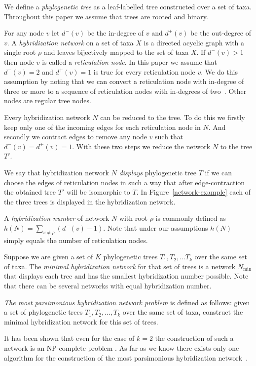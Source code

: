 \documentclass[runningheads, envcountsame, a4paper]{llncs}
\begin{document}
We define a \emph{phylogenetic tree} as a leaf-labelled tree constructed over a set of taxa. 
Throughout this paper we assume that trees are rooted and binary.

For any node $v$ let $d^-(v)$ be the in-degree of $v$ and $d^+(v)$ be the out-degree of $v$.
A \emph{hybridization network} on a set of taxa $X$ is a directed acyclic graph 
with a single root $\rho$ and leaves bijectively mapped to the set of taxa $X$. If $d^-(v) > 1$ then 
node $v$ is called a \emph{reticulation node}. In this paper we assume that $d^-(v) = 2$ and $d^+(v) = 1$ is true for every reticulation node $v$.
We do this assumption by noting that we can convert a reticulation node with in-degree 
of three or more to a sequence of reticulation nodes with in-degrees of two~\cite{wu2010close}. Other nodes are regular 
tree nodes.

Every hybridization network $N$ can be reduced to the tree. To do this we firstly keep only one of the incoming edges for each reticulation node in $N$. 
And secondly we contract edges to remove any node $v$ such that $d^-(v) = d^+(v) = 1$. With these two steps we reduce the network $N$ 
to the tree $T'$.

We say that hybridization network $N$ \emph{displays} phylogenetic tree $T$ 
if we can choose the edges of reticulation nodes in such a way that after edge-contraction the obtained tree $T'$ will be 
isomorphic to $T$. In Figure~\ref{network-example} each of the three trees is displayed in the hybridization network.

A \emph{hybridization number} of network $N$ with root $\rho$ is commonly defined as $h(N) = \sum\limits_{v \ne \rho} (d^-(v) - 1)$.
Note that under our assumptions $h(N)$ simply equals the number of reticulation nodes.

Suppose we are given a set of $K$ phylogenetic trees $T_1, T_2, ... T_k$ over the same set of taxa. The \emph{minimal 
hybridization network} for that set of trees is a network $N\mathrm{_{min}}$ that displays each tree and has the smallest 
hybridization number possible. Note that there can be several networks with equal hybridization number.

\emph{The most parsimonious hybridization network problem} is defined as follows:
given a set of phylogenetic trees $T_1, T_2, ..., T_k$ over the same set of taxa, construct the minimal hybridization 
network for this set of trees.

It has been shown that even for the case of $k=2$ the construction of such a network is an NP-complete problem 
\cite {bordewich2007computing}. As far as we know there exists only one algorithm for the construction of the most 
parsimonious hybridization network~\cite{wu2013algorithm}.
\end{document}
